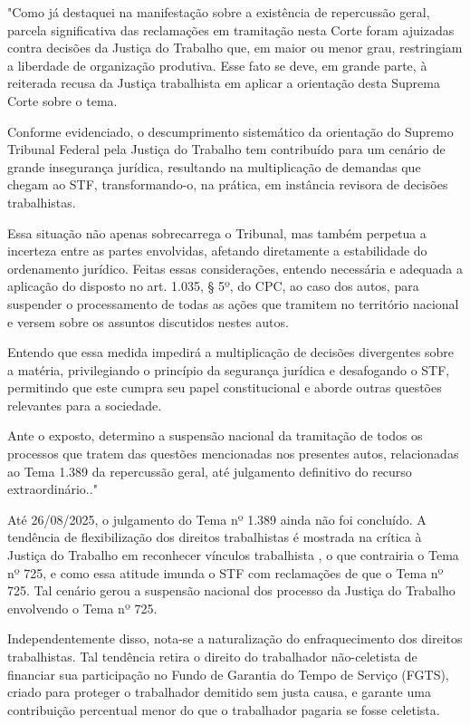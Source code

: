 \noindent
\begin{flushleft}
	\setlength{\leftskip}{4cm}
	\small
	"Como já destaquei na manifestação sobre a existência de repercussão
	geral, parcela significativa das reclamações em tramitação nesta Corte
	foram ajuizadas contra decisões da Justiça do Trabalho que, em maior ou
	menor grau, restringiam a liberdade de organização produtiva. Esse fato
	se deve, em grande parte, à reiterada recusa da Justiça trabalhista em
	aplicar a orientação desta Suprema Corte sobre o tema.
	
	Conforme evidenciado, o descumprimento sistemático da orientação
	do Supremo Tribunal Federal pela Justiça do Trabalho tem contribuído
	para um cenário de grande insegurança jurídica, resultando na
	multiplicação de demandas que chegam ao STF, transformando-o, na
	prática, em instância revisora de decisões trabalhistas.
	
	Essa situação não apenas sobrecarrega o Tribunal, mas também
	perpetua a incerteza entre as partes envolvidas, afetando diretamente a
	estabilidade do ordenamento jurídico.
	Feitas essas considerações, entendo necessária e adequada a
	aplicação do disposto no art. 1.035, § 5º, do CPC, ao caso dos autos, para
	suspender o processamento de todas as ações que tramitem no território
	nacional e versem sobre os assuntos discutidos nestes autos.
	
	Entendo que essa medida impedirá a multiplicação de decisões
	divergentes sobre a matéria, privilegiando o princípio da segurança
	jurídica e desafogando o STF, permitindo que este cumpra seu papel
	constitucional e aborde outras questões relevantes para a sociedade.
	
	Ante o exposto, determino a suspensão nacional da tramitação de
	todos os processos que tratem das questões mencionadas nos presentes
	autos, relacionadas ao Tema 1.389 da repercussão geral, até julgamento
	definitivo do recurso extraordinário.." \cite{suspensao_processos_jt_tema725}
\end{flushleft}

Até 26/08/2025, o julgamento do Tema nº 1.389 ainda não foi concluído. A tendência de flexibilização dos direitos trabalhistas é mostrada na crítica à Justiça do Trabalho em reconhecer vínculos trabalhista , o que contrairia o Tema nº 725, e como essa atitude imunda o STF com reclamações de que o Tema nº 725. Tal cenário gerou a suspensão nacional dos processo da Justiça do Trabalho envolvendo o Tema nº 725.  

Independentemente disso, nota-se a naturalização do enfraquecimento dos direitos trabalhistas. Tal tendência retira o direito do trabalhador não-celetista de financiar sua participação no Fundo de Garantia do Tempo de Serviço (FGTS), criado para proteger o trabalhador demitido sem justa causa, e garante uma contribuição percentual menor do que o trabalhador pagaria se fosse celetista.

